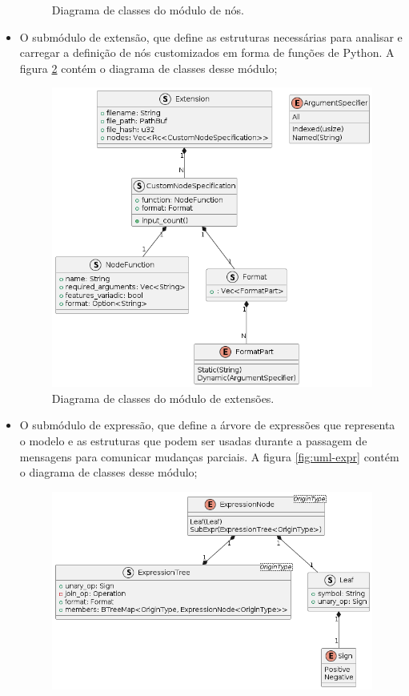\documentclass[
	12pt,				%
	openright,			%
	oneside,			%
	a4paper,			%
	main=brazil,
	english,			%
	]{ufsj-abntex2}
\begin{document}
\begin{itemize}
\begin{figure}[h]
        \caption{Diagrama de classes do módulo de nós.}
        \label{fig:uml-nodes}
    \end{figure}
    \item O submódulo de extensão, que define as estruturas necessárias para analisar e carregar a definição de nós customizados em forma de funções de Python. A figura \ref{fig:uml-extensions} contém o diagrama de classes desse módulo;
    \begin{figure}[h]
        \centering
        \includegraphics[scale=0.45]{diagrams/img/extensions.png} 
        \caption{Diagrama de classes do módulo de extensões.}
        \label{fig:uml-extensions}
    \end{figure}
    \item O submódulo de expressão, que define a árvore de expressões que representa o modelo e as estruturas que podem ser usadas durante a passagem de mensagens para comunicar mudanças parciais. A figura \ref{fig:uml-expr} contém o diagrama de classes desse módulo;
    \begin{figure}[h]
        \centering
        \includegraphics[scale=0.6]{diagrams/img/exprtree.png} 

\end{figure}
\end{itemize}
\end{document}
